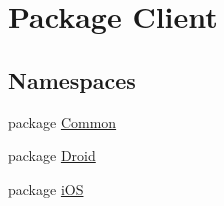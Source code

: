 \hypertarget{namespaceClient}{\section{Package Client}
\label{namespaceClient}
}
\subsection*{Namespaces}
\begin{DoxyCompactItemize}
\item 
package \hyperlink{namespaceClient_1_1Common}{Common}
\item 
package \hyperlink{namespaceClient_1_1Droid}{Droid}
\item 
package \hyperlink{namespaceClient_1_1iOS}{i\-O\-S}
\end{DoxyCompactItemize}
